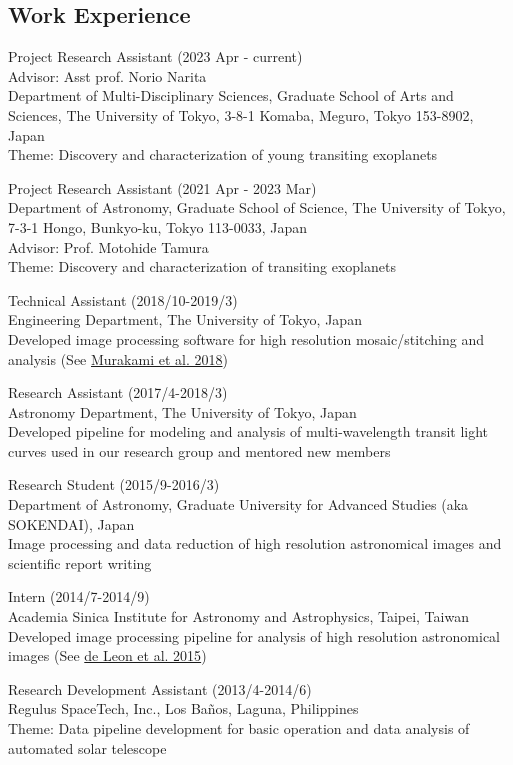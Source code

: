 \documentclass[11pt,letterpaper]{article}
\begin{document}
\subsection{Work Experience}
\begin{list}{}{\cvlist}
    \item
        Project Research Assistant (2023 Apr - current) \\
        Advisor: Asst prof. Norio Narita \\
        Department of Multi-Disciplinary Sciences, Graduate School of Arts and Sciences, The University of Tokyo, 3-8-1 Komaba, Meguro, Tokyo 153-8902, Japan \\
        Theme: Discovery and characterization of young transiting exoplanets \\
    \item
        Project Research Assistant (2021 Apr - 2023 Mar) \\
        Department of Astronomy, Graduate School of Science, The University of Tokyo, 7-3-1 Hongo, Bunkyo-ku, Tokyo 113-0033, Japan \\
        Advisor: Prof. Motohide Tamura \\
        Theme: Discovery and characterization of transiting exoplanets \\
    \item 
        Technical Assistant (2018/10-2019/3)\\
        Engineering Department, The University of Tokyo, Japan\\
        Developed image processing software for high resolution mosaic/stitching and analysis (See \href{\spieurl}{Murakami et al. 2018})
    \item 
        Research Assistant (2017/4-2018/3)\\	
        Astronomy Department, The University of Tokyo, Japan\\
        Developed pipeline for modeling and analysis of multi-wavelength transit light curves used in our research group and mentored new members
    \item 
        Research Student (2015/9-2016/3)\\
        Department of Astronomy, Graduate University for Advanced Studies (aka SOKENDAI), Japan\\
        Image processing and data reduction of high resolution astronomical images and scientific report writing
    \item 
        Intern (2014/7-2014/9)\\
        Academia Sinica Institute for Astronomy and Astrophysics, Taipei, Taiwan\\	
        Developed image processing pipeline for analysis of high resolution astronomical images (See \href{\paperone}{de Leon et al. 2015})
    \item 
        Research Development Assistant (2013/4-2014/6)\\
        Regulus SpaceTech, Inc., Los Ba\~nos, Laguna, Philippines\\
        Theme: Data pipeline development for basic operation and data analysis of automated solar telescope
\end{list}
\end{document}
